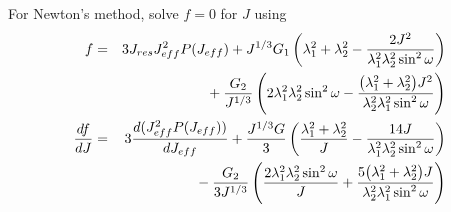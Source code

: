 \documentclass[11pt]{book}
\def\Jeff{J_{eff}}
\def\Jres{J_{res}}
\begin{document}
For Newton's method, solve $f=0$ for $J$ using
\begin{eqnarray}
	f & = & 3 \Jres \Jeff^2 P(\Jeff) + J^{1/3}G_1\left(\lambda_1^2 + \lambda_2^2 - {2J^2\over \lambda_1^2\lambda_2^2\sin^2\omega}\right)
\nonumber\\
&&\mbox{}
	  + {G_2\over J^{1/3}}\left(2\lambda_1^2\lambda_2^2 \sin^2\omega
	       - {\bigl(\lambda_1^2+\lambda_2^2\bigr)J^2\over \lambda_2^2\lambda_1^2\sin^2\omega}\right) \\
	{df\over dJ} & = & 3 {d(\Jeff^2 P(\Jeff))\over d\Jeff} +  {J^{1/3}G\over3}\left({\lambda_1^2 + \lambda_2^2\over J}-{14J\over\lambda_1^2\lambda_2^2\sin^2\omega}\right)
\nonumber \\
&&\mbox{}
	  - {G_2\over 3J^{1/3}}\left({2\lambda_1^2\lambda_2^2 \sin^2\omega\over J}
	       + {5\bigl(\lambda_1^2+\lambda_2^2\bigr)J\over \lambda_2^2\lambda_1^2\sin^2\omega}\right) 
\end{eqnarray}
\end{document}
